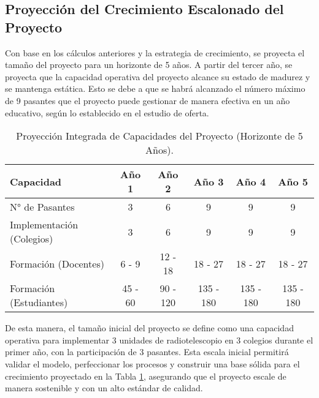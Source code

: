 \subsection{Proyección del Crecimiento Escalonado del Proyecto}
Con base en los cálculos anteriores y la estrategia de crecimiento, se proyecta
el tamaño del proyecto para un horizonte de 5 años. A partir del tercer año, se
proyecta que la capacidad operativa del proyecto alcance su estado de madurez y
se mantenga estática. Esto se debe a que se habrá alcanzado el número máximo de
9 pasantes que el proyecto puede gestionar de manera efectiva en un año
educativo, según lo establecido en el estudio de oferta.

\begin{table}[H]
  \centering
  \caption{Proyección Integrada de Capacidades del Proyecto (Horizonte de 5 Años).}
  \label{tab:proyeccion_integrada}
  \begin{tabular}{|l|c|c|c|c|c|}
    \hline
    \textbf{Capacidad} & \textbf{Año 1} & \textbf{Año 2} & \textbf{Año 3} & \textbf{Año 4} & \textbf{Año 5} \\ \hline
    \hline
    N° de Pasantes & 3 & 6 & 9 & 9 & 9 \\ \hline
    Implementación (Colegios) & 3 & 6 & 9 & 9 & 9 \\ \hline
    Formación (Docentes) & 6 - 9 & 12 - 18 & 18 - 27 & 18 - 27 & 18 - 27 \\ \hline
    Formación (Estudiantes) & 45 - 60 & 90 - 120 & 135 - 180 & 135 - 180 & 135 - 180 \\ \hline
  \end{tabular}
\end{table}

De esta manera, el tamaño inicial del proyecto se define como una capacidad
operativa para implementar 3 unidades de radiotelescopio en 3 colegios durante
el primer año, con la participación de 3 pasantes. Esta escala inicial permitirá
validar el modelo, perfeccionar los procesos y construir una base sólida para el
crecimiento proyectado en la Tabla \ref{tab:proyeccion_integrada}, asegurando
que el proyecto escale de manera sostenible y con un alto estándar de calidad.
